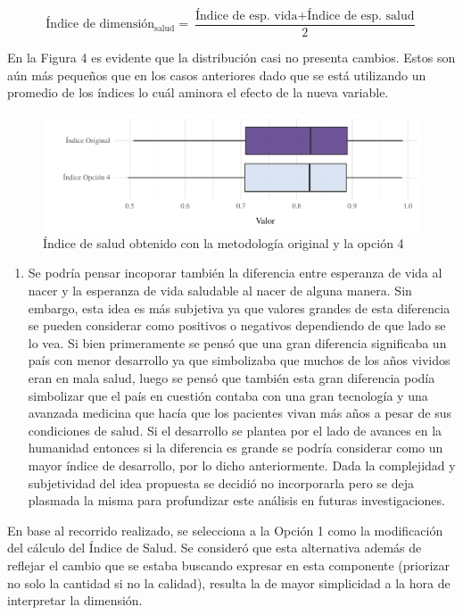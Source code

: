 \documentclass[
  10pt,
]{article}
\providecommand{\tightlist}{%
  \setlength{\itemsep}{0pt}\setlength{\parskip}{0pt}}
\begin{document}
\[\text{Índice de dimensión}_\text{salud}=\frac{\text{Índice de esp. vida}+\text{Índice de esp. salud}}{2}\]

En la Figura 4 es evidente que la distribución casi no presenta cambios.
Estos son aún más pequeños que en los casos anteriores dado que se está
utilizando un promedio de los índices lo cuál aminora el efecto de la
nueva variable.

\begin{figure}
\centering
\includegraphics{Informe_files/figure-latex/Figura4-1.pdf}
\caption{Índice de salud obtenido con la metodología original y la
opción 4}
\end{figure}

\begin{enumerate}
\def\labelenumi{\arabic{enumi}.}
\setcounter{enumi}{4}
\tightlist
\item
  Se podría pensar incoporar también la diferencia entre esperanza de
  vida al nacer y la esperanza de vida saludable al nacer de alguna
  manera. Sin embargo, esta idea es más subjetiva ya que valores grandes
  de esta diferencia se pueden considerar como positivos o negativos
  dependiendo de que lado se lo vea. Si bien primeramente se pensó que
  una gran diferencia significaba un país con menor desarrollo ya que
  simbolizaba que muchos de los años vividos eran en mala salud, luego
  se pensó que también esta gran diferencia podía simbolizar que el país
  en cuestión contaba con una gran tecnología y una avanzada medicina
  que hacía que los pacientes vivan más años a pesar de sus condiciones
  de salud. Si el desarrollo se plantea por el lado de avances en la
  humanidad entonces si la diferencia es grande se podría considerar
  como un mayor índice de desarrollo, por lo dicho anteriormente. Dada
  la complejidad y subjetividad del idea propuesta se decidió no
  incorporarla pero se deja plasmada la misma para profundizar este
  análisis en futuras investigaciones.
\end{enumerate}

En base al recorrido realizado, se selecciona a la Opción 1 como la
modificación del cálculo del Índice de Salud. Se consideró que esta
alternativa además de reflejar el cambio que se estaba buscando expresar
en esta componente (priorizar no solo la cantidad si no la calidad),
resulta la de mayor simplicidad a la hora de interpretar la dimensión.
\end{document}
